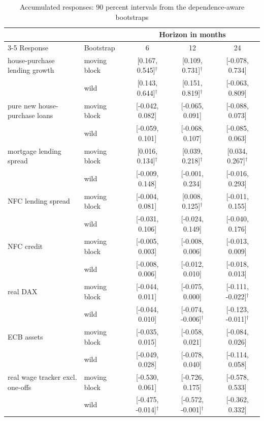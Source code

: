 \begin{table}[htbp]
  \centering
  \caption{Accumulated responses: 90 percent intervals from the dependence-aware bootstraps}
  \label{tab:bootstrap-cumulative}
  \footnotesize
  \setlength{\tabcolsep}{4pt}
  \begin{tabular}{@{}llccc@{}}
    \toprule
    & & \multicolumn{3}{c}{Horizon in months} \\
    \cmidrule(lr){3-5}
    Response & Bootstrap & 6 & 12 & 24 \\
    \midrule
    house-purchase lending growth & moving block & [0.167, 0.545]$^{\dagger}$ & [0.109, 0.731]$^{\dagger}$ & [-0.078, 0.734] \\
     & wild & [0.143, 0.644]$^{\dagger}$ & [0.151, 0.819]$^{\dagger}$ & [-0.063, 0.809] \\[0.3em]
    pure new house-purchase loans & moving block & [-0.042, 0.082] & [-0.065, 0.091] & [-0.088, 0.073] \\
     & wild & [-0.059, 0.101] & [-0.068, 0.107] & [-0.085, 0.063] \\[0.3em]
    mortgage lending spread & moving block & [0.016, 0.134]$^{\dagger}$ & [0.039, 0.218]$^{\dagger}$ & [0.034, 0.267]$^{\dagger}$ \\
     & wild & [-0.009, 0.148] & [-0.001, 0.234] & [-0.016, 0.293] \\[0.3em]
    NFC lending spread & moving block & [-0.004, 0.081] & [0.008, 0.125]$^{\dagger}$ & [-0.011, 0.155] \\
     & wild & [-0.031, 0.106] & [-0.024, 0.149] & [-0.040, 0.176] \\[0.3em]
    NFC credit & moving block & [-0.005, 0.003] & [-0.008, 0.006] & [-0.013, 0.009] \\
     & wild & [-0.008, 0.006] & [-0.012, 0.010] & [-0.018, 0.013] \\[0.3em]
    real DAX & moving block & [-0.044, 0.011] & [-0.075, 0.000] & [-0.111, -0.022]$^{\dagger}$ \\
     & wild & [-0.044, 0.010] & [-0.074, -0.006]$^{\dagger}$ & [-0.123, -0.011]$^{\dagger}$ \\[0.3em]
    ECB assets & moving block & [-0.035, 0.015] & [-0.058, 0.021] & [-0.084, 0.026] \\
     & wild & [-0.049, 0.028] & [-0.078, 0.040] & [-0.114, 0.058] \\[0.3em]
    real wage tracker excl. one-offs & moving block & [-0.530, 0.061] & [-0.726, 0.175] & [-0.578, 0.533] \\
     & wild & [-0.475, -0.014]$^{\dagger}$ & [-0.572, -0.001]$^{\dagger}$ & [-0.362, 0.332] \\[0.3em]

\end{tabular}
\end{table}
